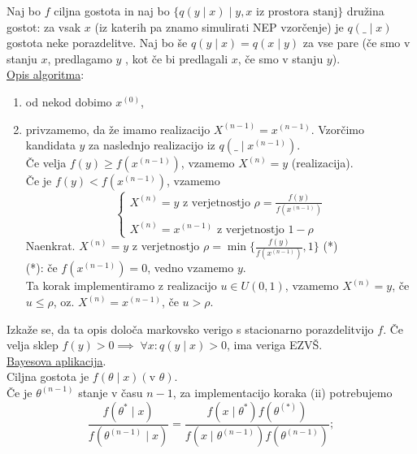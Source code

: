 \documentclass[a4paper, 12pt]{book}
\theoremstyle{definition}
\theoremstyle{remark}
\begin{document}
Naj bo $f$ ciljna gostota in naj bo $\{q(y \mid x) \mid y,x \text{ iz prostora stanj}\}$ družina  gostot:
za vsak $x$ (iz katerih pa znamo simulirati NEP vzorčenje) je $q(\_ \mid x)$ gostota neke porazdelitve.
Naj bo še $q(y \mid x) = q(x \mid y)$ za vse pare (če smo v stanju $x$, predlagamo $y$ ,
kot če bi predlagali $x$, če smo v stanju $y$). \\
\underline{Opis algoritma}:
\begin{enumerate}[label=(\roman*)]
  \item od nekod dobimo $x^{(0)}$,
  \item privzamemo, da že imamo realizacijo $X^{(n-1)} = x^{(n-1)}$.
    Vzorčimo kandidata $y$ za naslednjo realizacijo iz $q(\_ \mid x^{(n-1)})$. \\
    Če velja $f(y) \geq f\left(x^{(n-1)}\right)$, vzamemo $X^{(n)} = y$ (realizacija). \\
    Če je $f(y) < f\left(x^{(n-1)}\right)$, vzamemo
    \begin{equation*}
      \begin{cases}
        X^{(n)} = y \text{ z verjetnostjo } \rho = \frac{f(y)}{f\left(x^{(n-1)}\right)} \\
        X^{(n)} = x^{(n-1)} \text{ z verjetnostjo } 1 - \rho
      \end{cases}
    \end{equation*}
    Naenkrat. $X^{(n)} = y$ z verjetnostjo $\rho = \min \{\frac{f(y)}{f\left(x^{(n-1)}\right)}, 1\}$ (*) \\
    (*): če $f\left(x^{(n-1)}\right) = 0$, vedno vzamemo $y$. \\
    Ta korak implementiramo z realizacijo $u \in U(0,1)$, vzamemo $X^{(n)} = y$, če $u \leq \rho$, oz. $X^{(n)} = x^{(n-1)}$, če $u > \rho$.
\end{enumerate}
Izkaže se, da ta opis določa markovsko verigo s stacionarno porazdelitvijo $f$.
Če velja sklep $f(y) > 0 \implies \; \forall x: q(y \mid x) > 0$, ima veriga EZVŠ. \\
\underline{Bayesova aplikacija}. \\
Ciljna gostota je $f(\theta \mid x) (\text{v } \theta)$. \\
Če je $\theta^{(n-1)}$ stanje v času $n-1$, za implementacijo koraka (ii) potrebujemo
\begin{equation*}
  \frac{f(\theta^{*} \mid x)}{f(\theta^{(n-1)} \mid x)} = \frac{f(x \mid \theta^{*}) f(\theta^{(*)})}{f(x \mid \theta^{(n-1)}) f(\theta^{(n-1)})};
\end{equation*}
\end{document}

